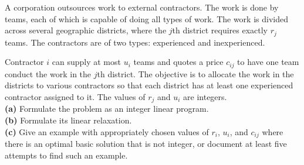 \documentclass[fleqn]{homework}
\begin{document}
  \begin{problem}{7}
    \begin{question}
      A corporation outsources work to external contractors.  The work is done
      by teams, each of which is capable of doing all types of work.  The work
      is divided across several geographic districts, where the $j$th district
      requires exactly $r_j$ teams.  The contractors are of two types:
      experienced and inexperienced.

      Contractor $i$ can supply at most $u_i$ teams and quotes a price $c_{ij}$
      to have one team conduct the work in the $j$th district.  The objective is
      to allocate the work in the districts to various contractors so that each
      district has at least one experienced contractor assigned to it.  The
      values of $r_j$ and $u_i$ are integers.\\
      \textbf{(a)} Formulate the problem as an integer linear program.\\
      \textbf{(b)} Formulate its linear relaxation.\\
      \textbf{(c)} Give an example with appropriately chosen values of $r_i$,
    $u_i$, and $c_{ij}$ where there is an optimal basic solution that is not
    integer, or document at least five attempts to find such an example.
    \end{question}
  \end{problem}
\end{document}
